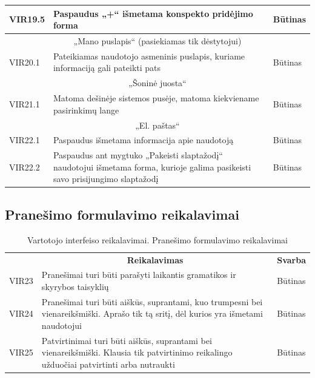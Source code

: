 \documentclass{VUMIFPSkursinis}
\begin{document}
\begin{longtable}{|p{2cm}|p{}|p{}|}
{VIR19.5}&{Paspaudus „+“ išmetama konspekto pridėjimo forma}&{Būtinas}\\ \hline
\multicolumn{3}{|c|}{„Mano puslapis“ (pasiekiamas tik dėstytojui)}\\ \hline
{VIR20.1}&{Pateikiamas naudotojo asmeninis puslapis, kuriame informaciją gali pateikti pats}&{Būtinas}\\ \hline
\multicolumn{3}{|c|}{„Šoninė juosta“}\\ \hline
{VIR21.1}&{Matoma dešinėje sistemos pusėje, matoma kiekviename pasirinkimų lange}&{Būtinas}\\ \hline
\multicolumn{3}{|c|}{„El. paštas“}\\ \hline
{VIR22.1}&{Paspaudus išmetama informacija apie naudotoją}&{Būtinas}\\ \hline
{VIR22.2}&{Paspaudus ant mygtuko „Pakeisti slaptažodį“ naudotojui išmetama forma, kurioje galima pasikeisti savo prisijungimo slaptažodį}&{Būtinas}\\ \hline
\end{longtable}

\subsection{Pranešimo formulavimo reikalavimai}
\begin{table}[H]
	\caption{Vartotojo interfeiso reikalavimai. Pranešimo formulavimo reikalavimai}
	\begin{tabular}{|p{2cm}|p{}|p{2cm}|}
	\hline \rowcolor{lightgray} \multicolumn{3}{|c|}{5. Pranešimo formulavimo reikalavimai}\\	\hline 
\rowcolor{gray!50} \multicolumn{1}{|c|}{{\bfseries Kodas}}&\multicolumn{1}{c|}{{\bfseries Reikalavimas}}&\multicolumn{1}{c|}{{\bfseries Svarba}}\\ \hline
{VIR23}&	{Pranešimai turi būti parašyti laikantis gramatikos ir skyrybos taisyklių}&{Būtinas}\\ \hline	
{VIR24}&	{Pranešimai turi būti aiškūs, suprantami, kuo trumpesni bei vienareikšmiški. Aprašo tik tą sritį, dėl kurios yra išmetami naudotojui}&{Būtinas}\\ \hline	
{VIR25}&	{Patvirtinimai turi būti aiškūs, suprantami bei vienareikšmiški. Klausia tik patvirtinimo reikalingo užduočiai patvirtinti arba nutraukti}&{Būtinas}\\ \hline
\end{tabular}		
\end{table}
\end{document}
